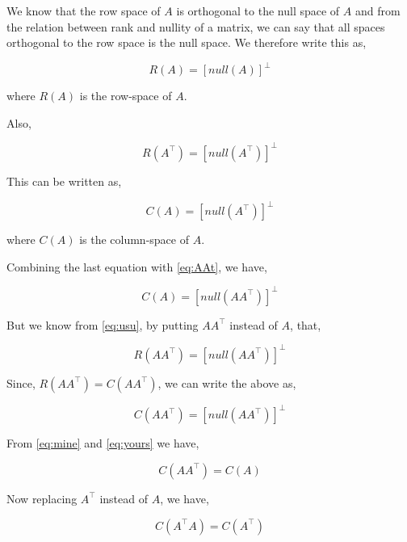 \documentclass[a4paper]{article}
\begin{document}
We know that the row space of $A$ is orthogonal to the null space of $A$ and from the relation between rank and nullity of a matrix, we can say that all spaces orthogonal to the row space is the null space. We therefore write this as,

\begin{equation}
R(A) = \left[null(A)\right]^{\perp}
\label{eq:usu}
\end{equation}

where $R(A)$ is the row-space of $A$.

Also,

\begin{equation}
R(A^{\top}) = \left[null(A^{\top})\right]^{\perp}
\end{equation}

This can be written as,

\begin{equation}
C(A) = \left[null(A^{\top})\right]^{\perp}
\end{equation}

where $C(A)$ is the column-space of $A$.

Combining the last equation with \ref{eq:AAt}, we have,

\begin{equation}
C(A) = \left[null(AA^{\top})\right]^{\perp}\label{eq:mine}
\end{equation}

But we know from \ref{eq:usu}, by putting $AA^{\top}$ instead of $A$, that,

\begin{equation}
R(AA^{\top}) = \left[null(AA^{\top})\right]^{\perp}
\end{equation}

Since, $R(AA^{\top})=C(AA^{\top})$, we can write the above as,

\begin{equation}
C(AA^{\top}) = \left[null(AA^{\top})\right]^{\perp}
\label{eq:yours}
\end{equation}

From \ref{eq:mine} and \ref{eq:yours} we have,

\begin{equation}
C(AA^{\top}) = C(A)
\end{equation}

Now replacing $A^{\top}$ instead of $A$, we have,

\begin{equation}
C(A^{\top}A) = C(A^{\top})
\end{equation}
\end{document}
